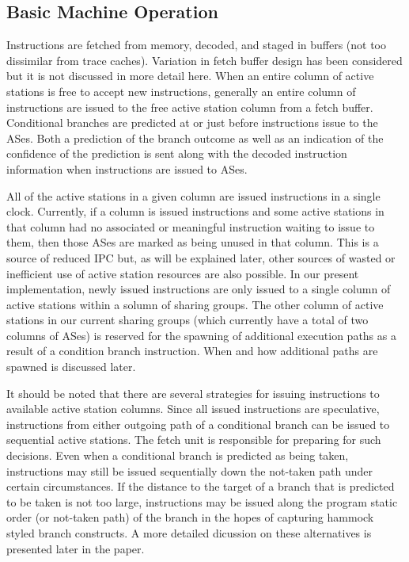 \documentclass[10pt,dvips]{article}
\begin{document}
\subsection{Basic Machine Operation}
%
Instructions are fetched from memory, decoded, and staged in buffers
(not too dissimilar from trace caches).  Variation in fetch buffer
design has been considered but it is not discussed in more detail here.
When an entire column
of active stations is free to accept new instructions, generally
an entire column of instructions are issued to the free active station
column from a fetch buffer.
Conditional branches are
predicted at or just before instructions issue to the ASes.
Both a prediction of the branch outcome as well as an indication
of the confidence of the prediction is sent along with the
decoded instruction information when instructions are issued to
ASes.

All of the active stations in a given column are issued instructions
in a single clock.  Currently, if a column is issued instructions
and some
active stations in that column had no associated or meaningful
instruction waiting to issue to them, then those ASes are marked
as being unused in that column.  This is a source of reduced IPC but, as will
be explained later, other sources of wasted or inefficient use of
active station resources are also possible.
In our present implementation, newly issued instructions
are only issued to a single column of active stations within
a solumn of sharing groups.  The other column of active stations
in our current sharing groups (which currently have a total
of two columns of ASes) is reserved for the spawning of additional
execution paths as a result of a condition branch instruction.
When and how additional paths are spawned is discussed later.

It should be noted that there are several strategies for
issuing instructions to available active station columns.
Since all issued instructions are speculative, instructions
from either outgoing path of a conditional branch can be issued
to sequential active stations.
The fetch unit is responsible for preparing for such decisions.
Even when a conditional branch is predicted as being taken,
instructions may still be issued sequentially down the not-taken
path under certain circumstances.  If the distance to the target 
of a branch
that is predicted to be taken is not too large,
instructions may be issued along the program static order (or not-taken
path) of the branch in the hopes of capturing hammock styled branch
constructs.  A more detailed dicussion on these alternatives is
presented later in the paper.
\end{document}
